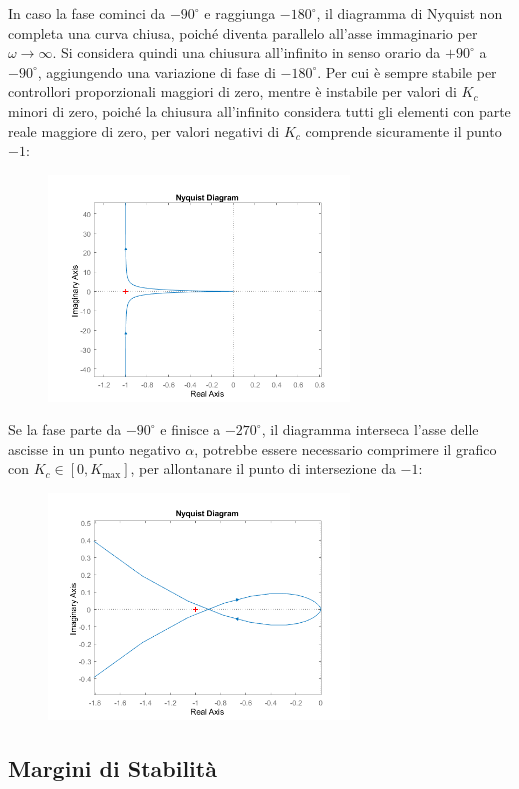 \documentclass{article}
\numberwithin{equation}{subsection}
\begin{document}
In caso la fase cominci da $-90^{\circ}$ e raggiunga $-180^{\circ}$, il diagramma di Nyquist non completa una curva chiusa, poiché diventa parallelo all'asse 
immaginario per $\omega\to\infty$. Si considera quindi una chiusura all'infinito in senso orario da $+90^{\circ}$ a $-90^{\circ}$, aggiungendo una variazione 
di fase di $-180^{\circ}$. Per cui è sempre stabile per controllori proporzionali maggiori di zero, mentre è instabile per valori di $K_c$ minori di zero, poiché 
la chiusura all'infinito considera tutti gli elementi con parte reale maggiore di zero, per valori negativi di $K_c$ comprende sicuramente il punto $-1$: 

\begin{figure}[H]%
    \centering
    \includegraphics[width=8cm]{Nyquist3.png}%
\end{figure}

Se la fase parte da $-90^{\circ}$ e finisce a $-270^{\circ}$, il diagramma interseca l'asse delle ascisse in un punto negativo $\alpha$, potrebbe essere necessario comprimere 
il grafico con $K_c\in[0,K_{\max}]$, per allontanare il punto di intersezione da $-1$: 

\begin{figure}[H]%
    \centering
    \includegraphics[width=8cm]{Nyquist4.png}%
\end{figure}

\subsection{Margini di Stabilità}
\end{document}
